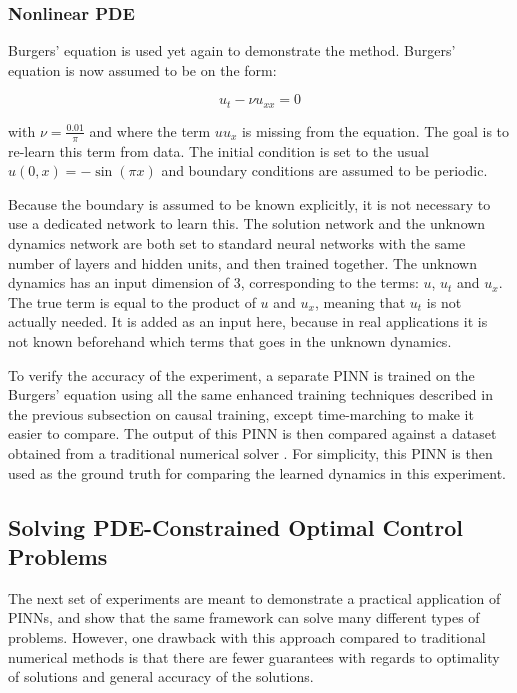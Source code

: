\subsubsection{Nonlinear PDE}

Burgers' equation is used yet again to demonstrate the method. Burgers' equation is now assumed to be on the form:

\begin{equation}
    u_t - \nu u_{xx} = 0
\end{equation}

\noindent with $\nu = \frac{0.01}{\pi}$ and where the term $u u_x$ is missing from the equation. The goal is to re-learn this term from data. The initial condition is set to the usual $u(0, x) = - \sin(\pi x)$ and boundary conditions are assumed to be periodic.

Because the boundary is assumed to be known explicitly, it is not necessary to use a dedicated network to learn this. The solution network and the unknown dynamics network are both set to standard neural networks with the same number of layers and hidden units, and then trained together. The unknown dynamics has an input dimension of 3, corresponding to the terms: $u$, $u_t$ and $u_x$. The true term is equal to the product of $u$ and $u_x$, meaning that $u_t$ is not actually needed. It is added as an input here, because in real applications it is not known beforehand which terms that goes in the unknown dynamics.

To verify the accuracy of the experiment, a separate PINN is trained on the Burgers' equation using all the same enhanced training techniques described in the previous subsection on causal training, except time-marching to make it easier to compare. The output of this PINN is then compared against a dataset obtained from a traditional numerical solver \cite{og_pinn_github}. For simplicity, this PINN is then used as the ground truth for comparing the learned dynamics in this experiment.

\subsection{Solving PDE-Constrained Optimal Control Problems}

The next set of experiments are meant to demonstrate a practical application of PINNs, and show that the same framework can solve many different types of problems. However, one drawback with this approach compared to traditional numerical methods is that there are fewer guarantees with regards to optimality of solutions and general accuracy of the solutions.

